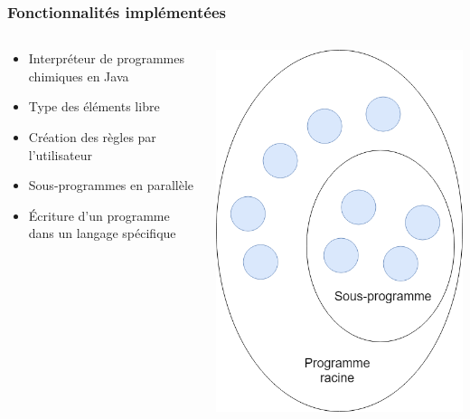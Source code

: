 \documentclass{beamer}
\begin{document}
\begin{frame}
\frametitle{Fonctionnalités implémentées}
\begin{columns}

\begin{column}{7cm}
\begin{itemize}
    \item Interpréteur de programmes chimiques en Java
    \item Type des éléments libre
    \item Création des règles par l’utilisateur
    \item Sous-programmes en parallèle
    \item Écriture d'un programme dans un langage spécifique
\end{itemize}
\end{column}

\begin{column}{5cm}
\begin{center}
\includegraphics[scale=0.3]{img/P6.png}
\end{center}
\end{column}

\end{columns}
\end{frame}
\end{document}
